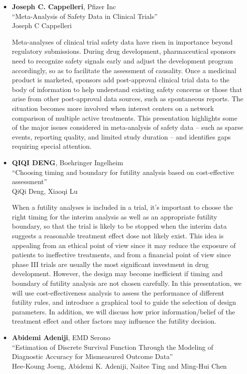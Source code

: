 \begin{itemize}
\item \textbf{Joseph C. Cappelleri}, Pfizer Inc \\
``Meta-Analysis of Safety Data in Clinical Trials'' \\
Joseph C Cappelleri


Meta-analyses of clinical trial safety data have risen in importance beyond regulatory submissions. During drug development, pharmaceutical sponsors need to recognize safety signals early and adjust the development program accordingly, so as to facilitate the assessment of causality. Once a medicinal product is marketed, sponsors add post-approval clinical trial data to the body of information to help understand existing safety concerns or those that arise from other post-approval data sources, such as spontaneous reports. The situation becomes more involved when interest centers on a network comparison of multiple active treatments.  This presentation highlights some of the major issues considered in meta-analysis of safety data – such as sparse events, reporting quality, and limited study duration – and identifies gaps requiring special attention.   

\item \textbf{QIQI DENG}, Boehringer Ingelheim \\
``Choosing timing and boundary for futility analysis based on cost-effective assessment'' \\
QiQi Deng, Xiaoqi Lu


When a futility analyses is included in a trial, it’s important to choose the right timing for the interim analysis as well as an appropriate futility boundary, so that the trial is likely to be stopped when the interim data suggests a reasonable treatment effect dose not likely exist. This idea is appealing from an ethical point of view since it may reduce the exposure of patients to ineffective treatments, and from a financial point of view since phase III trials are usually the most significant investment in drug development. However, the design may become inefficient if timing and boundary of futility analysis are not chosen carefully. In this presentation, we will use cost-effectiveness analysis to assess the performance of different futility rules, and introduce a graphical tool to guide the selection of design parameters. In addition, we will discuss how prior information/belief of the treatment effect and other factors may influence the futility decision.

\item \textbf{Abidemi Adeniji}, EMD Serono \\
``Estimation of Discrete Survival Function Through the Modeling of Diagnostic Accuracy for Mismeasured Outcome Data'' \\
Hee-Koung Joeng, Abidemi K. Adeniji, Naitee Ting and Ming-Hui Chen



\end{itemize}

